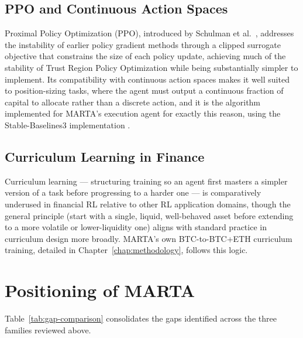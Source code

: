 \subsection{PPO and Continuous Action Spaces}
\label{subsec:rl-ppo}

Proximal Policy Optimization (PPO), introduced by Schulman et al.\ \cite{ppo2017}, addresses the instability of earlier policy gradient methods through a clipped surrogate objective that constrains the size of each policy update, achieving much of the stability of Trust Region Policy Optimization \cite{trpo2015} while being substantially simpler to implement. Its compatibility with continuous action spaces makes it well suited to position-sizing tasks, where the agent must output a continuous fraction of capital to allocate rather than a discrete action, and it is the algorithm implemented for MARTA's execution agent for exactly this reason, using the Stable-Baselines3 implementation \cite{sb3}.

\subsection{Curriculum Learning in Finance}
\label{subsec:rl-curriculum}

Curriculum learning \cite{bengio2009} --- structuring training so an agent first masters a simpler version of a task before progressing to a harder one --- is comparatively underused in financial RL relative to other RL application domains, though the general principle (start with a single, liquid, well-behaved asset before extending to a more volatile or lower-liquidity one) aligns with standard practice in curriculum design more broadly. MARTA's own BTC-to-BTC+ETH curriculum training, detailed in Chapter~\ref{chap:methodology}, follows this logic.

\section{Positioning of MARTA}
\label{sec:positioning-marta}

Table~\ref{tab:gap-comparison} consolidates the gaps identified across the three families reviewed above.


